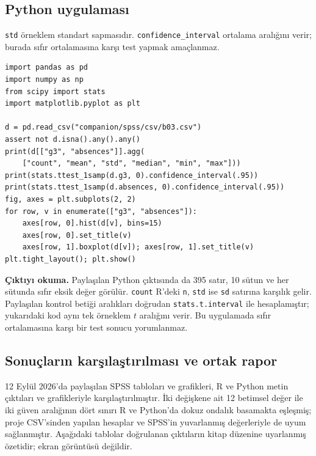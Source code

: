 \par\noindent\begin{minipage}{\linewidth}
\subsection{Python uygulaması}
\label{sec:python-b03}

\texttt{std} örneklem standart sapmasıdır. \texttt{confidence\_interval} ortalama aralığını verir; burada sıfır ortalamasına karşı test yapmak amaçlanmaz.

\begin{lstlisting}[style=prismPythonApp]
import pandas as pd
import numpy as np
from scipy import stats
import matplotlib.pyplot as plt

d = pd.read_csv("companion/spss/csv/b03.csv")
assert not d.isna().any().any()
print(d[["g3", "absences"]].agg(
    ["count", "mean", "std", "median", "min", "max"]))
print(stats.ttest_1samp(d.g3, 0).confidence_interval(.95))
print(stats.ttest_1samp(d.absences, 0).confidence_interval(.95))
fig, axes = plt.subplots(2, 2)
for row, v in enumerate(["g3", "absences"]):
    axes[row, 0].hist(d[v], bins=15)
    axes[row, 0].set_title(v)
    axes[row, 1].boxplot(d[v]); axes[row, 1].set_title(v)
plt.tight_layout(); plt.show()
\end{lstlisting}

\textbf{Çıktıyı okuma.} Paylaşılan Python çıktısında da 395 satır,
10 sütun ve her sütunda sıfır eksik değer görülür. \texttt{count}
R'deki \texttt{n}, \texttt{std} ise \texttt{sd} satırına karşılık gelir.
Paylaşılan kontrol betiği aralıkları doğrudan \texttt{stats.t.interval}
ile hesaplamıştır; yukarıdaki kod aynı tek örneklem $t$ aralığını verir.
Bu uygulamada sıfır ortalamasına karşı bir test sonucu yorumlanmaz.
\end{minipage}\par

\subsection{Sonuçların karşılaştırılması ve ortak rapor}
12 Eylül 2026'da paylaşılan SPSS tabloları ve grafikleri, R ve Python
metin çıktıları ve grafikleriyle karşılaştırılmıştır. İki değişkene ait
12 betimsel değer ile iki güven aralığının dört sınırı R ve Python'da
dokuz ondalık basamakta eşleşmiş; proje CSV'sinden yapılan hesaplar
ve SPSS'in yuvarlanmış değerleriyle de uyum sağlanmıştır.
Aşağıdaki tablolar doğrulanan çıktıların kitap düzenine uyarlanmış
özetidir; ekran görüntüsü değildir.

